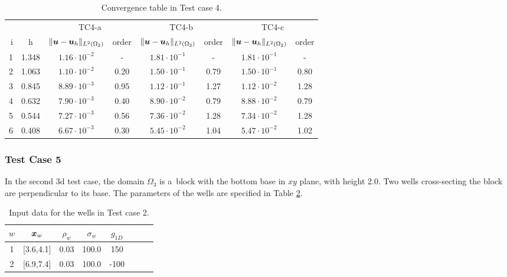 \begin{table}[!htb]
\begin{center}
\bgroup
\def\arraystretch{1.2}
\setlength\tabcolsep{5pt}
\begin{tabular}{rc|cc|cc|cc}
\toprule
\multicolumn{2}{c|}{} & \multicolumn{2}{c|}{ TC4-a } & \multicolumn{2}{c|}{ TC4-b } & \multicolumn{2}{c}{TC4-c}\\ [3pt] %
i & h & $\|\mathbf{\boldsymbol{u}}-\mathbf{\boldsymbol{u}}_h\|_{L^2(\Omega_2)}$ & order & $\|\mathbf{\boldsymbol{u}}-\mathbf{\boldsymbol{u}}_h\|_{L^2(\Omega_2)}$
    & order & $\|\mathbf{\boldsymbol{u}}-\mathbf{\boldsymbol{u}}_h\|_{L^2(\Omega_2)}$ & order \\ [3pt] \midrule
1 & 1.348 &  $1.16\cdot10^{-2}$  &  -   &  $1.81\cdot10^{-1}$  &  -   &  $1.81\cdot10^{-1}$ &   -   \\
2 & 1.063 &  $1.10\cdot10^{-2}$  & 0.20 &  $1.50\cdot10^{-1}$  & 0.79 &  $1.50\cdot10^{-1}$ &  0.80 \\
3 & 0.845 &  $8.89\cdot10^{-3}$  & 0.95 &  $1.12\cdot10^{-1}$  & 1.27 &  $1.12\cdot10^{-2}$ &  1.28 \\
4 & 0.632 &  $7.90\cdot10^{-3}$  & 0.40 &  $8.90\cdot10^{-2}$  & 0.79 &  $8.88\cdot10^{-2}$ &  0.79 \\
5 & 0.544 &  $7.27\cdot10^{-3}$  & 0.56 &  $7.36\cdot10^{-2}$  & 1.28 &  $7.34\cdot10^{-2}$ &  1.28 \\
6 & 0.408 &  $6.67\cdot10^{-3}$  & 0.30 &  $5.45\cdot10^{-2}$  & 1.04 &  $5.47\cdot10^{-2}$ &  1.02 \\
\bottomrule
\end{tabular}
\caption{Convergence table in Test case 4.}
\label{tab:mh_tc4_convergence}
\egroup
\end{center}
\end{table}


\subsubsection{Test Case 5}
In the second 3d test case, the domain $\Omega_3$ is a~block with the bottom base in $xy$ plane,
with height 2.0.
Two wells cross-secting the block are perpendicular to its base.
The parameters of the wells are specified in Table \ref{tab:tc5_data}.
%
\begin{table}[!hb]
\begin{center}
\begin{tabular}{cccccccc}
\toprule
$w$ & $\mathbf{\boldsymbol{x}}_w$  & $\rho_w$ & $\sigma_w$ & $g_{1D}$\\
\midrule
1& [3.6,4.1] & 0.03 & 100.0 & 150 \\
2& [6.9,7.4] & 0.03 & 100.0 & -100 \\
\bottomrule
\end{tabular}
\caption{Input data for the wells in Test case 2.}
\label{tab:tc5_data}
\end{center}
\end{table}

